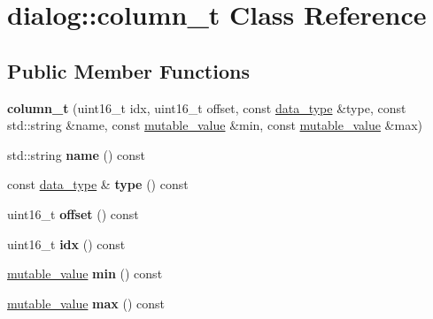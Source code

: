 \hypertarget{classdialog_1_1column__t}{}\section{dialog\+:\+:column\+\_\+t Class Reference}
\label{classdialog_1_1column__t}
\subsection*{Public Member Functions}
\begin{DoxyCompactItemize}
\item 
\mbox{\label{classdialog_1_1column__t_a90d375f7d115c8241453867ebaf36b89}} 
{\bfseries column\+\_\+t} (uint16\+\_\+t idx, uint16\+\_\+t offset, const \hyperlink{structdialog_1_1data__type}{data\+\_\+type} \&type, const std\+::string \&name, const \hyperlink{classdialog_1_1mutable__value}{mutable\+\_\+value} \&min, const \hyperlink{classdialog_1_1mutable__value}{mutable\+\_\+value} \&max)
\item 
\mbox{\label{classdialog_1_1column__t_a2a5d9e2d2673082a96218bb3c5b335b2}} 
std\+::string {\bfseries name} () const
\item 
\mbox{\label{classdialog_1_1column__t_a8316411224f15b6f25c59471422ca167}} 
const \hyperlink{structdialog_1_1data__type}{data\+\_\+type} \& {\bfseries type} () const
\item 
\mbox{\label{classdialog_1_1column__t_a3889fc0e609ebba20c9b323a194cade1}} 
uint16\+\_\+t {\bfseries offset} () const
\item 
\mbox{\label{classdialog_1_1column__t_aca785728bbaaced685cd2e0d6a027173}} 
uint16\+\_\+t {\bfseries idx} () const
\item 
\mbox{\label{classdialog_1_1column__t_a2c391fd127a2cdfbb5304c618f81b0b7}} 
\hyperlink{classdialog_1_1mutable__value}{mutable\+\_\+value} {\bfseries min} () const
\item 
\mbox{\label{classdialog_1_1column__t_a1588992ac054925f217f41a0de488896}} 
\hyperlink{classdialog_1_1mutable__value}{mutable\+\_\+value} {\bfseries max} () const

\end{DoxyCompactItemize}
